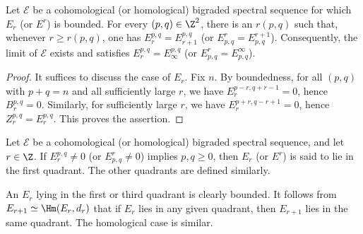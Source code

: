\begin{proposition}
	Let $\mathscr{E}$ be a cohomological (or homological) bigraded spectral
	sequence for which $E_r$ (or $E^r$) is bounded. For every
	$(p,q)\in\Z^2$, there is an $r(p,q)$ such that, whenever
	$r\geq r(p,q)$, one has $E_r^{p,q}=E_{r+1}^{p,q}$ (or
	$E^r_{p,q}=E^{r+1}_{p,q}$). Consequently, the limit of $\mathscr{E}$
	exists and satisfies $E_r^{p,q}=E_\infty^{p,q}$ (or
	$E^r_{p,q}=E^\infty_{p,q}$).
\end{proposition}
\begin{proof}
	It suffices to discuss the case of $E_r$. Fix $n$. By boundedness, for all
	$(p,q)$ with $p+q=n$ and all sufficiently large $r$, we have
	$E_r^{p-r,q+r-1}=0$, hence $B_r^{p,q}=0$. Similarly, for sufficiently
	large $r$, we have $E_r^{p+r,q-r+1}=0$, hence
	$Z_r^{p,q}=E_r^{p,q}$. This proves the assertion.
\end{proof}

\begin{definition}\label{def:quadrant-ss}
	Let $\mathscr{E}$ be a cohomological (or homological) bigraded spectral
	sequence, and let $r\in\Z$. If $E_r^{p,q}\neq0$ (or
	$E^r_{p,q}\neq0$) implies $p,q\geq0$, then $E_r$ (or $E^r$) is said to
	lie in the first quadrant. The other quadrants are defined similarly.
\end{definition}

An $E_r$ lying in the first or third quadrant is clearly bounded. It follows
from $E_{r+1}\simeq\Hm(E_r,d_r)$ that if $E_r$ lies in any given quadrant,
then $E_{r+1}$ lies in the same quadrant. The homological case is similar.


